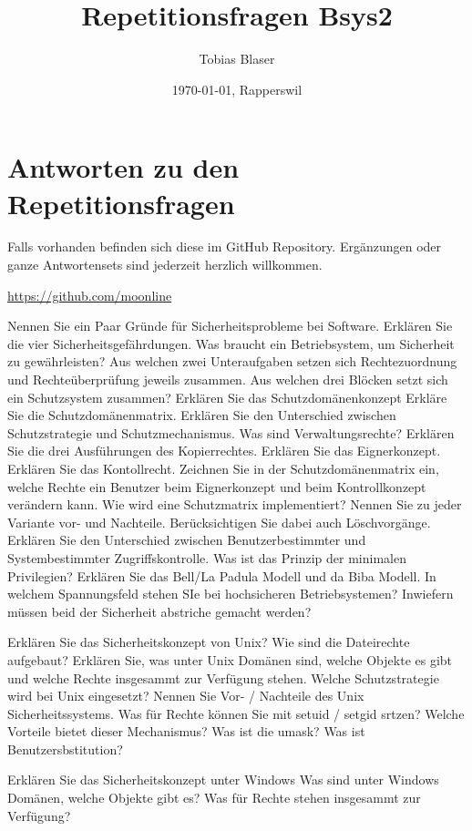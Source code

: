 \documentclass[ngerman,a4paper,12pt]{scrreprt}
\title{Repetitionsfragen Bsys2}
\author{Tobias Blaser}
\date{\today{}, Rapperswil}
\begin{document}
\tableofcontents

\vspace{1cm}
\section*{Antworten zu den Repetitionsfragen}
Falls vorhanden befinden sich diese im GitHub Repository. Ergänzungen oder ganze Antwortensets sind jederzeit herzlich willkommen.

\noindent\url{https://github.com/moonline}

\clearpage


\ol
	\li Nennen Sie ein Paar Gründe für Sicherheitsprobleme bei Software.
	\li Erklären Sie die vier Sicherheitsgefährdungen.
	\li Was braucht ein Betriebsystem, um Sicherheit zu gewährleisten?
	\li Aus welchen zwei Unteraufgaben setzen sich Rechtezuordnung und Rechteüberprüfung jeweils zusammen.
	\li Aus welchen drei Blöcken setzt sich ein Schutzsystem zusammen?
	\li Erklären Sie das Schutzdomänenkonzept
	\li Erkläre Sie die Schutzdomänenmatrix.
	\li Erklären Sie den Unterschied zwischen Schutzstrategie und Schutzmechanismus.
	\li Was sind Verwaltungsrechte?
	\li Erklären Sie die drei Ausführungen des Kopierrechtes.
	\li Erklären Sie das Eignerkonzept.
	\li Erklären Sie das Kontollrecht.
	\li Zeichnen Sie in der Schutzdomänenmatrix ein, welche Rechte ein Benutzer beim Eignerkonzept und beim Kontrollkonzept verändern kann.
	\li Wie wird eine Schutzmatrix implementiert? Nennen Sie zu jeder Variante vor- und Nachteile. Berücksichtigen Sie dabei auch Löschvorgänge.
	\li Erklären Sie den Unterschied zwischen Benutzerbestimmter und Systembestimmter Zugriffskontrolle.
	\li Was ist das Prinzip der minimalen Privilegien?
	\li Erklären Sie das Bell/La Padula Modell und da Biba Modell.
	\li In welchem Spannungsfeld stehen SIe bei hochsicheren Betriebsystemen? Inwiefern müssen beid der Sicherheit abstriche gemacht werden?
\olS

\olR
	\li Erklären Sie das Sicherheitskonzept von Unix? Wie sind die Dateirechte aufgebaut?
	\li Erklären Sie, was unter Unix Domänen sind, welche Objekte es gibt und welche Rechte insgesammt zur Verfügung stehen.
	\li Welche Schutzstrategie wird bei Unix eingesetzt?
	\li Nennen Sie Vor- / Nachteile des Unix Sicherheitssystems.
	\li Was für Rechte können Sie mit setuid / setgid srtzen? Welche Vorteile bietet dieser Mechanismus?
	\li Was ist die umask?
	\li Was ist Benutzersbstitution?
\olS

\olR
	\li Erklären Sie das Sicherheitskonzept unter Windows
	\li Was sind unter Windows Domänen, welche Objekte gibt es? Was für Rechte stehen insgesammt zur Verfügung?
	
\end{document}
